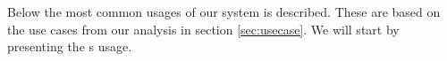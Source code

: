 Below the most common usages of our system is described.
These are based on the use cases from our analysis in section \ref{sec:usecase}.
We will start by presenting the \aclient[]s usage.







